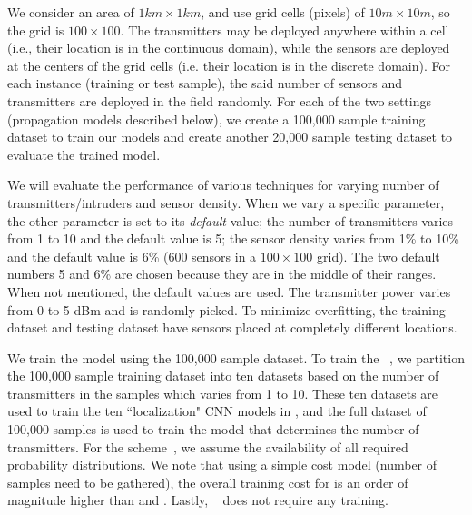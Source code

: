 We consider an area
of $1km \times 1km$, and use grid cells (pixels) of 
$10 m \times 10 m$, so the grid is $100\times100$. 
The transmitters may be deployed
anywhere within a cell (i.e., their location is in the continuous
domain), while the sensors are deployed at the centers of the grid cells (i.e. their location is in the discrete domain).
For each instance (training or test sample), the said number of sensors and transmitters are deployed in the field randomly. 
For each of the two settings (propagation models described below), we create a 100,000 sample training dataset to train our models and create another 20,000 sample testing dataset to evaluate the trained model. 

We will evaluate the performance of various techniques for
varying number of transmitters/intruders and sensor
density. When we vary a specific parameter, the other parameter
is set to its \emph{default} value; the number of transmitters varies from 1 to 10 and the default value is 5; the sensor density varies from 1\% to 10\% and the default value is 6\% (600  sensors in a $100\times100$ grid).
The two default numbers 5 and 6\% are chosen because they are in the middle of their ranges.
When not mentioned, the default values are used.
The transmitter power varies from 0 to 5 dBm and is randomly picked.
To minimize overfitting, the training dataset and testing dataset have sensors placed at completely different locations.

We train the \our model using the 100,000 sample dataset. To train the \deeptx~\cite{icccn20-deeptxfinder}, we partition the 100,000 sample training dataset into ten datasets based on the number of transmitters in the samples which varies from 1 to 10. 
These ten datasets are used to train the ten ``localization" CNN models in \deeptx, and the full dataset of 100,000 samples is used to train the \deeptx model that determines the number of transmitters. 
For the \map scheme~\cite{ipsn20-mtl}, we assume the availability of all required probability distributions. We note that using a simple cost model (number of samples need to be gathered), 
the overall training cost for \map is an order of magnitude higher than \our and \deeptx. 
Lastly, \splot~\cite{mobicom17-splot} does not require any training.





